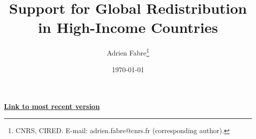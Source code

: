 \documentclass[12pt,english]{article}
\title{Support for Global Redistribution\\
in High-Income Countries
}
\author{Adrien Fabre\footnote{CNRS, CIRED. E-mail: adrien.fabre@cnrs.fr (corresponding author).}
} %
\date{\today} %
\begin{document}
\maketitle

\begin{center}
{\textbf{\href{https://github.com/bixiou/international_attitudes_toward_global_policies/raw/main/papers/support_global_redistr.pdf}{Link to most recent version}}}
\end{center}



\begin{abstract}
 
\end{abstract}



\clearpage
\tableofcontents

\onehalfspacing %
\end{document}
